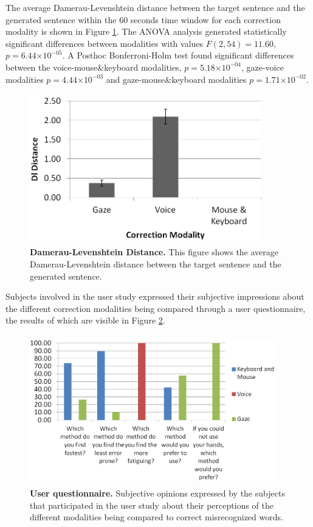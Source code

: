 \documentclass[]{article}
\providecommand{\e}[1]{\ensuremath{\times 10^{#1}}}
\begin{document}
The average Damerau-Levenshtein distance between the target sentence and the generated sentence within the 60 seconds
time window for each correction modality is shown in Figure \ref{dldistance}. The ANOVA analysis generated statistically
significant differences between modalities with values $F(2,54)=11.60$, $p=6.44\e{-05}$. A Posthoc Bonferroni-Holm test
found significant differences between the voice-mouse\&keyboard modalities, $p=5.18\e{-04}$, gaze-voice modalities
$p=4.44\e{-03}$ and gaze-mouse\&keyboard modalities $p=1.71\e{-02}$.


\begin{figure}[!ht]
\begin{center}
\vspace{-3mm}
\includegraphics[width=0.9\textwidth,height=65mm]{figures/dldistance.png}
\end{center}
\caption{\textbf{Damerau-Levenshtein Distance.} This figure shows the average Damerau-Levenshtein distance between the 
target sentence and the generated sentence.}
\label{dldistance}
\end{figure}


Subjects involved in the user study  expressed their subjective impressions about the different correction
modalities being compared through a user questionnaire, the results of which are visible in Figure \ref{questionnaire}.


\begin{figure}[!ht]
\begin{center}
\vspace{-3mm}
\includegraphics[width=0.95\textwidth,height=65mm]{figures/questionnaire.png}
\end{center}
\caption{\textbf{User questionnaire.} Subjective opinions expressed by the subjects that participated in the user
study about their perceptions of the different modalities being compared to correct misrecognized words.}
\label{questionnaire}
\end{figure}
\end{document}
